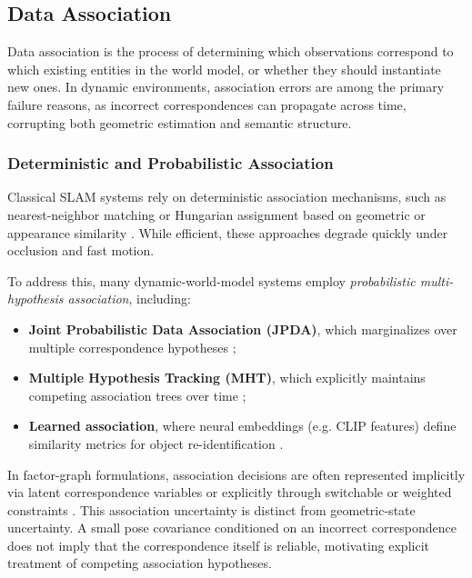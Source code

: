 \subsection{Data Association}\label{sec:construction_pipeline_data_association}
Data association is the process of determining which observations correspond to which existing entities in the world model, or whether they should instantiate new ones. 
In dynamic environments, association errors are among the primary failure reasons, as incorrect correspondences can propagate across time,  corrupting both geometric estimation and semantic structure. 

\subsubsection{Deterministic and Probabilistic Association}
Classical SLAM systems rely on deterministic association mechanisms, such as nearest-neighbor matching or Hungarian assignment based on geometric or appearance similarity \cite{lingzhu_xiang_robust_2015} \cite{gou_visual_2024}. 
While efficient, these approaches degrade quickly under occlusion and fast motion.

To address this, many dynamic-world-model systems employ \textit{probabilistic multi-hypothesis association}, including:
\begin{itemize}
    \item \textbf{Joint Probabilistic Data Association (JPDA)}, which marginalizes over multiple correspondence hypotheses \cite{gulati_robust_2017};
    \item \textbf{Multiple Hypothesis Tracking (MHT)}, which explicitly maintains competing association trees over time \cite{zaech_learnable_2022};
    \item \textbf{Learned association}, where neural embeddings (e.g. CLIP features) define similarity metrics for object re-identification \cite{gu_conceptgraphs_2023} \cite{yan_dynamic_2025}.
\end{itemize}
In factor-graph formulations, association decisions are often represented implicitly via latent correspondence variables or explicitly through switchable or weighted constraints \cite{giberna_dynemo-slam_2025} \cite{lingzhu_xiang_robust_2015}.
This association uncertainty is distinct from geometric-state uncertainty. A small pose covariance conditioned on an incorrect correspondence does not imply that the correspondence itself is reliable, motivating explicit treatment of competing association hypotheses.

